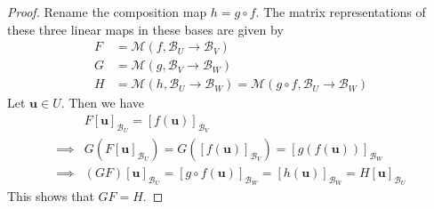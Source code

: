 \begin{proof}
Rename the composition map  $h=g \circ f$. The matrix representations of these three linear maps in these bases are given by
\begin{align*}
F &= \mathcal{M}(f,\mathcal{B}_U \to \mathcal{B}_V) \\
G &= \mathcal{M}(g,\mathcal{B}_V \to \mathcal{B}_W) \\
H &= \mathcal{M}(h,\mathcal{B}_U \to \mathcal{B}_W) = \mathcal{M}(g \circ f,\mathcal{B}_U \to \mathcal{B}_W)
\end{align*}
Let $\mathbf{u}\in U$. Then we have
\begin{align*}
& F[\mathbf{u}]_{\mathcal{B}_U} = [f(\mathbf{u})]_{\mathcal{B}_V} \\
\implies & G(F[\mathbf{u}]_{\mathcal{B}_U}) = G([f(\mathbf{u})]_{\mathcal{B}_V}) = [g(f(\mathbf{u}))]_{\mathcal{B}_W} \\
\implies & (GF)[\mathbf{u}]_{\mathcal{B}_U} = [g\circ f(\mathbf{u})]_{\mathcal{B}_W} = [h(\mathbf{u})]_{\mathcal{B}_W} = H[\mathbf{u}]_{\mathcal{B}_U}
\end{align*}
This shows that $GF = H$.
\end{proof}

